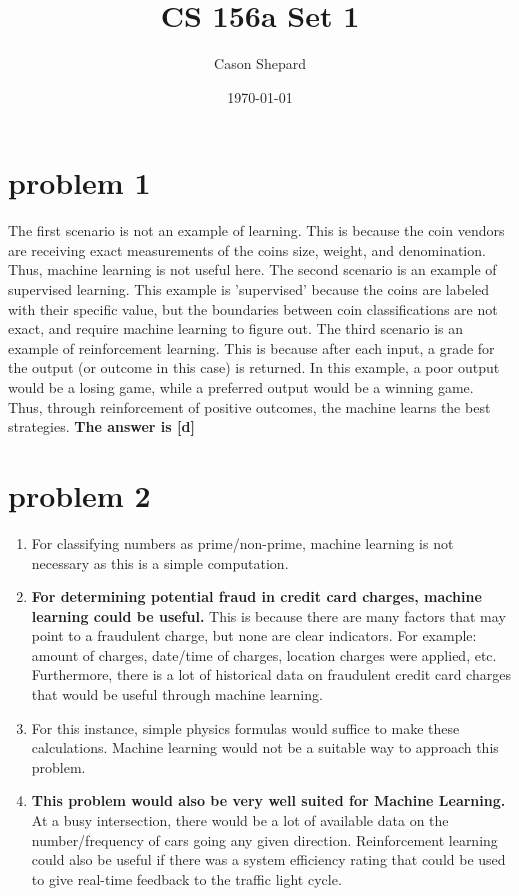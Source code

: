 \documentclass{article}
\title{CS 156a Set 1}
\author{Cason Shepard}
\date\today
\begin{document}
\maketitle

\section*{problem 1}
The first scenario is not an example of learning. This is because the coin vendors are receiving exact measurements of the coins size, weight, and denomination. Thus, machine learning is not useful here.
\newline \newline
The second scenario is an example of supervised learning. This example is 'supervised' because the coins are labeled with their specific value, but the boundaries between coin classifications are not exact, and require machine learning to figure out.
\newline\newline
The third scenario is an example of reinforcement learning. This is because after each input, a grade for the output (or outcome in this case) is returned. In this example, a poor output would be a losing game, while a preferred output would be a winning game. Thus, through reinforcement of positive outcomes, the machine learns the best strategies.
\newline\newline 
\textbf{The answer is [d]}

\section*{problem 2}
\begin{enumerate}[label=(\roman*)]
    \item For classifying numbers as prime/non-prime, machine learning is not necessary as this is a simple computation.
    \item \textbf{For determining potential fraud in credit card charges, machine learning could be useful.} This is because there are many factors that may point to a fraudulent charge, but none are clear indicators. For example: amount of charges, date/time of charges, location charges were applied, etc. Furthermore, there is a lot of historical data on fraudulent credit card charges that would be useful through machine learning.
    \item For this instance, simple physics formulas would suffice to make these calculations. Machine learning would not be a suitable way to approach this problem.
    \item \textbf{This problem would also be very well suited for Machine Learning.} At a busy intersection, there would be a lot of available data on the number/frequency of cars going any given direction. Reinforcement learning could also be useful if there was a system efficiency rating that could be used to give real-time feedback to the traffic light cycle. 
\end{enumerate}
\end{document}
